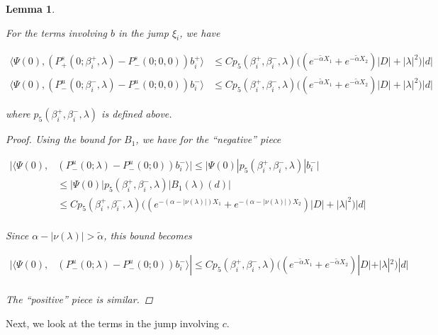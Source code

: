 \documentclass[12pt]{article}
\newtheorem{lemma}{Lemma}
\begin{document}
\begin{lemma}\label{jumpb}

For the terms involving $b$ in the jump $\xi_i$, we have

\begin{align*}
\langle \Psi(0), (P^s_+(0; \beta_i^+, \lambda) - P^s_-(0; 0, 0))b_i^+ \rangle
&\leq C p_5(\beta_i^+, \beta_i^-, \lambda) \Big( (e^{-\tilde{\alpha} X_1}+e^{-\tilde{\alpha} X_2})|D| + |\lambda|^2 \Big)|d|\\
\langle \Psi(0), (P^u_-(0; \beta_i^-, \lambda) - P^u_-(0; 0, 0))b_i^- \rangle
&\leq C p_5(\beta_i^+, \beta_i^-, \lambda)\Big( (e^{-\tilde{\alpha} X_1}+e^{-\tilde{\alpha} X_2})|D| + |\lambda|^2 \Big)|d|
\end{align*}

where $p_5(\beta_i^+, \beta_i^-, \lambda)$ is defined above.

\begin{proof}

Using the bound for $B_1$, we have for the ``negative'' piece

\begin{align*}
|\langle \Psi(0), &(P^u_-(0; \lambda) - P^u_-(0; 0))b_i^- \rangle|
\leq |\Psi(0)| p_5(\beta_i^+, \beta_i^-, \lambda)|b_i^-| \\
&\leq |\Psi(0)| p_5(\beta_i^+, \beta_i^-, \lambda)|B_1(\lambda)(d)| \\
&\leq C p_5(\beta_i^+, \beta_i^-, \lambda) \Big( (e^{-(\alpha - |\nu(\lambda)|) X_1} 
+ e^{-(\alpha - |\nu(\lambda)|) X_2}) |D| + |\lambda|^2 \Big)|d|\\
\end{align*}

Since $\alpha - |\nu(\lambda)| > \tilde{\alpha}$, this bound becomes

\begin{align*}
|\langle \Psi(0), &(P^u_-(0; \lambda) - P^u_-(0; 0))b_i^- \rangle|
\leq C p_5(\beta_i^+, \beta_i^-, \lambda) \Big( (e^{-\tilde{\alpha} X_1} + e^{-\tilde{\alpha} X_2}) |D| + |\lambda|^2 \Big)|d|\\
\end{align*}

The ``positive'' piece is similar.

\end{proof}
\end{lemma}

Next, we look at the terms in the jump involving $c$.

\end{document}
